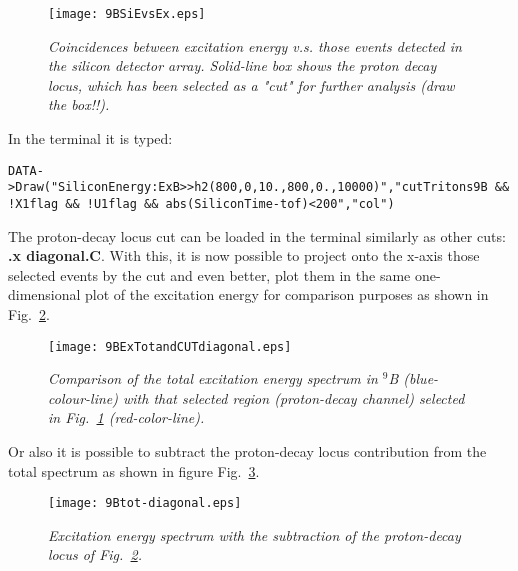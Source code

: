 \documentclass[11pt]{report}
\begin{document}
\begin{figure}[h]
 \begin{center}
\texttt{[image: 9BSiEvsEx.eps]}  
 \end{center}
\vspace*{-4mm}
\caption{\label{fig:9BSiEvsEx} \it Coincidences between excitation energy v.s. those events detected in the silicon detector array. Solid-line box shows the proton decay locus, which has been
selected as a "cut" for further analysis ({\color{red}draw the box!!}).}
\end{figure}
\vspace*{4mm}

\noindent
In the terminal it is typed:
\tiny
\begin{verbatim}
DATA->Draw("SiliconEnergy:ExB>>h2(800,0,10.,800,0.,10000)","cutTritons9B && !X1flag && !U1flag && abs(SiliconTime-tof)<200","col")
\end{verbatim}
\normalsize

\noindent
The proton-decay locus cut can be loaded in the terminal similarly as other cuts: 
\textbf{.x diagonal.C}. With this, it is now possible to project onto the x-axis 
those selected events by the 
cut and even better, plot them in the same one-dimensional plot of the excitation 
energy for comparison purposes as shown in Fig.~\ref{fig:9BExTotandCUTdiagonal}.\\

\begin{figure}[h]
 \begin{center}
\texttt{[image: 9BExTotandCUTdiagonal.eps]}  
 \end{center}
\vspace*{-4mm}
\caption{\label{fig:9BExTotandCUTdiagonal} \it Comparison of the total excitation energy spectrum in $^{9}$B (blue-colour-line) with that selected region (proton-decay channel) selected in Fig.~\ref{fig:9BSiEvsEx} 
(red-color-line).}
\end{figure}
\vspace*{4mm}

\noindent
Or also it is possible to subtract the proton-decay locus contribution from the total spectrum as shown in figure Fig.~\ref{fig:9Btot-diagonal}.

\begin{figure}[h]
 \begin{center}
\texttt{[image: 9Btot-diagonal.eps]}  
 \end{center}
\vspace*{-4mm}
\caption{\label{fig:9Btot-diagonal} \it Excitation energy spectrum with the subtraction of the proton-decay locus of Fig.~\ref{fig:9BExTotandCUTdiagonal}.}
\end{figure}
\vspace*{4mm}
\end{document}
